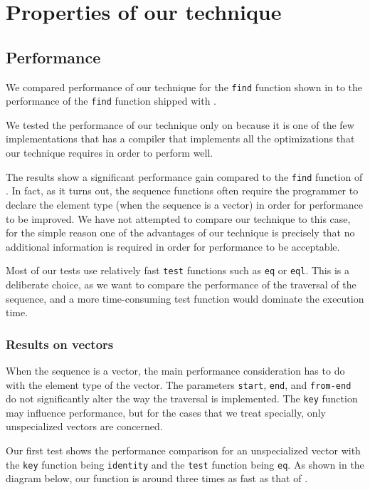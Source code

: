 \section{Properties of our technique}

\subsection{Performance}

We compared performance of our technique for the \texttt{find}
function shown in  to the
performance of the \texttt{find} function shipped with \sbcl{}.

We tested the performance of our technique only on \sbcl{} because it
is one of the few implementations that has a compiler that implements
all the optimizations that our technique requires in order to perform
well.

The results show a significant performance gain compared to the
\texttt{find} function of \sbcl{}.  In fact, as it turns out, the
\sbcl{} sequence functions often require the programmer to declare the
element type (when the sequence is a vector) in order for performance
to be improved.  We have not attempted to compare our technique to
this case, for the simple reason one of the advantages of our
technique is precisely that no additional information is required in
order for performance to be acceptable.

Most of our tests use relatively fast \texttt{test} functions such as
\texttt{eq} or \texttt{eql}.  This is a deliberate choice, as we
want to compare the performance of the traversal of the sequence,
and a more time-consuming test function would dominate the execution
time.

\subsubsection{Results on vectors}

When the sequence is a vector, the main performance consideration has
to do with the element type of the vector.  The parameters
\texttt{start}, \texttt{end}, and \texttt{from-end} do not
significantly alter the way the traversal is implemented.  The
\texttt{key} function may influence performance, but for the cases
that we treat specially, only unspecialized vectors are concerned.

Our first test shows the performance comparison for an unspecialized
vector with the \texttt{key} function being \texttt{identity} and the
\texttt{test} function being \texttt{eq}.  As shown in the diagram
below, our function is around three times as fast as that of \sbcl{}.

